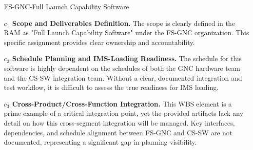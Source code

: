 \begin{frame}{FS-GNC-Full Launch Capability Software}
\begin{minipage}{0.90\textwidth}
\raggedright
\fontsize{8}{9.5}\selectfont
\textbf{\(c_1\) Scope and Deliverables Definition.}
The scope is clearly defined in the RAM as "Full Launch Capability Software" under the FS-GNC organization. This specific assignment provides clear ownership and accountability.\par\vspace{0.6em}
\textbf{\(c_2\) Schedule Planning and IMS-Loading Readiness.}
The schedule for this software is highly dependent on the schedules of both the GNC hardware team and the CS-SW integration team. Without a clear, documented integration and test workflow, it is difficult to assess the true readiness for IMS loading.\par\vspace{0.6em}
\textbf{\(c_3\) Cross-Product/Cross-Function Integration.}
This WBS element is a prime example of a critical integration point, yet the provided artifacts lack any detail on how this cross-segment integration will be managed. Key interfaces, dependencies, and schedule alignment between FS-GNC and CS-SW are not documented, representing a significant gap in planning visibility.\par\vspace{0.6em}
\end{minipage}
\end{frame}

\endinput
